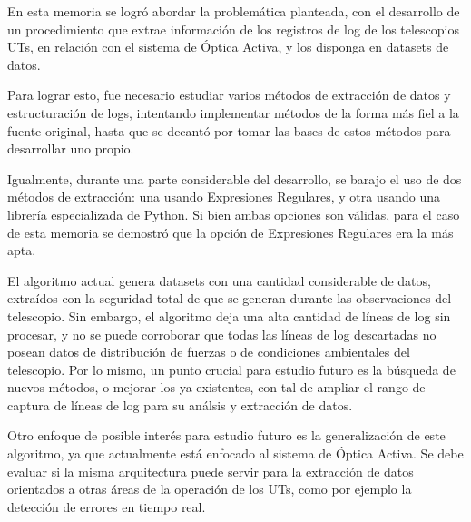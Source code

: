 
En esta memoria se logró abordar la problemática planteada, con el desarrollo de un procedimiento que extrae información de los registros de log de los telescopios UTs, en relación con el sistema de Óptica Activa, y los disponga en datasets de datos.

Para lograr esto, fue necesario estudiar varios métodos de extracción de datos y estructuración de logs, intentando implementar métodos de la forma más fiel a la fuente original, hasta que se decantó por tomar las bases de estos métodos para desarrollar uno propio.

Igualmente, durante una parte considerable del desarrollo, se barajo el uso de dos métodos de extracción: una usando Expresiones Regulares, y otra usando una librería especializada de Python. Si bien ambas opciones son válidas, para el caso de esta memoria se demostró que la opción de Expresiones Regulares era la más apta.

El algoritmo actual genera datasets con una cantidad considerable de datos, extraídos con la seguridad total de que se generan durante las observaciones del telescopio. Sin embargo, el algoritmo deja una alta cantidad de líneas de log sin procesar, y no se puede corroborar que todas las líneas de log descartadas no posean datos de distribución de fuerzas o de condiciones ambientales del telescopio. Por lo mismo, un punto crucial para estudio futuro es la búsqueda de nuevos métodos, o mejorar los ya existentes, con tal de ampliar el rango de captura de líneas de log para su análsis y extracción de datos.

Otro enfoque de posible interés para estudio futuro es la generalización de este algoritmo, ya que actualmente está enfocado al sistema de Óptica Activa. Se debe evaluar si la misma arquitectura puede servir para la extracción de datos orientados a otras áreas de la operación de los UTs, como por ejemplo la detección de errores en tiempo real.
